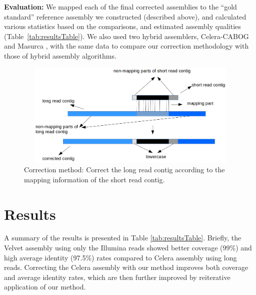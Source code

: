 \documentclass[12pt,a4paper]{cibb}
\begin{document}
\textbf{Evaluation:} We mapped each of the final corrected assemblies to the ``gold standard'' reference assembly we constructed (described above), and calculated various statistics based on the comparisons, and estimated assembly qualities (Table~\ref{tab:resultsTable}). We also used two hybrid assemblers, Celera-CABOG~\cite{cabogMiller:2008} and Masurca \cite{masurcaZimin:2013}, with the same data to compare our correction methodology with those of hybrid assembly algorithms.


\begin{figure}[htbp]
\centerline{\includegraphics[width=12cm, height=5cm]{BACAlgorithm1.png}}
\caption{Correction method: Correct the long read contig according to the mapping information of the short read contig.}
\label{correction}
\end{figure}


\section{\bf Results}
\label{res}
A summary of the results is presented in Table \ref{tab:resultsTable}. Briefly, the Velvet assembly using only the Illumina reads showed better coverage (99\%) and high average identity  (97.5\%) rates compared to Celera assembly using long reads. Correcting the Celera assembly with our method improves both coverage and average identity rates, which are then further improved by reiterative application of our method. 
\end{document}
